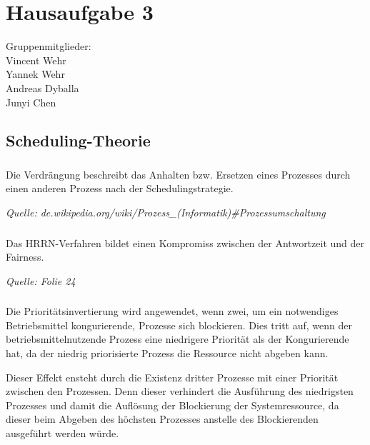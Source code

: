 \documentclass[a4paper]{article}
\newenvironment{quelle}{\medskip \noindent\itshape Quelle: }{\bigskip}
\newcommand{\hausaufgabenNr}{3}
\begin{document}
\setcounter{section}{\hausaufgabenNr}
\setcounter{subsection}{3}
\section*{Hausaufgabe \hausaufgabenNr}
Gruppenmitglieder:\\
Vincent Wehr\\
Yannek Wehr\\
Andreas Dyballa\\
Junyi Chen
\subsection{Scheduling-Theorie}
\subsubsection{} 
Die Verdrängung beschreibt das Anhalten bzw. Ersetzen eines Prozesses 
durch einen anderen Prozess nach der Schedulingstrategie.

\begin{quelle} de.wikipedia.org/wiki/Prozess\_(Informatik)\#Prozessumschaltung \end{quelle}

\subsubsection{}
Das HRRN-Verfahren bildet einen Kompromiss zwischen der Antwortzeit und der Fairness.

\begin{quelle}
  Folie 24
\end{quelle}

\subsubsection{}
Die Prioritätsinvertierung wird angewendet, wenn zwei, um ein notwendiges Betriebsmittel kongurierende, 
Prozesse sich blockieren. Dies tritt auf, wenn der betriebsmittelnutzende Prozess eine niedrigere Priorität als der Kongurierende hat, da der niedrig priorisierte Prozess die Ressource nicht abgeben kann.

Dieser Effekt ensteht durch die Existenz dritter Prozesse mit einer Priorität zwischen den Prozessen.
Denn dieser verhindert die Ausführung des niedrigsten Prozesses und damit die Auflösung der Blockierung der Systemressource, da dieser beim Abgeben des höchsten Prozesses anstelle des Blockierenden ausgeführt werden würde.
\end{document}
